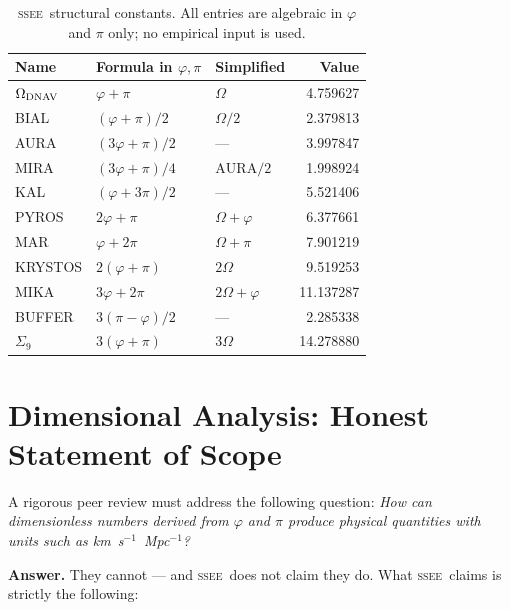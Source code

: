 \documentclass[12pt,a4paper]{article}
\newcommand{\SSEE}{\ifmmode\mathrm{SSEE}\else\textsc{ssee}\fi}
\begin{document}
\begin{table}[ht]
\centering
\caption{\SSEE\ structural constants. All entries are algebraic in $\varphi$
and $\pi$ only; no empirical input is used.}
\label{tab:constants}
\begin{tabular}{lll r}
\toprule
Name & Formula in $\varphi,\pi$ & Simplified & Value \\
\midrule
$\Omega_{\rm DNAV}$ & $\varphi+\pi$           & $\Omega$       & 4.759627 \\
BIAL  & $(\varphi+\pi)/2$                       & $\Omega/2$     & 2.379813 \\
AURA  & $(3\varphi+\pi)/2$                      & —              & 3.997847 \\
MIRA  & $(3\varphi+\pi)/4$                      & $\mathrm{AURA}/2$ & 1.998924 \\
KAL   & $(\varphi+3\pi)/2$                      & —              & 5.521406 \\
PYROS & $2\varphi+\pi$                           & $\Omega+\varphi$ & 6.377661 \\
MAR   & $\varphi+2\pi$                          & $\Omega+\pi$   & 7.901219 \\
KRYSTOS & $2(\varphi+\pi)$                      & $2\Omega$      & 9.519253 \\
MIKA  & $3\varphi+2\pi$                         & $2\Omega+\varphi$ & 11.137287 \\
BUFFER & $3(\pi-\varphi)/2$                     & —              & 2.285338 \\
$\Sigma_9$ & $3(\varphi+\pi)$                   & $3\Omega$      & 14.278880 \\
\bottomrule
\end{tabular}
\end{table}

\section{Dimensional Analysis: Honest Statement of Scope}
\label{sec:dimensional}

A rigorous peer review must address the following question:
\emph{How can dimensionless numbers derived from $\varphi$ and $\pi$ produce
physical quantities with units such as km~s$^{-1}$~Mpc$^{-1}$?}

\textbf{Answer.}
They cannot — and \SSEE\ does not claim they do.
What \SSEE\ claims is strictly the following:
\end{document}
